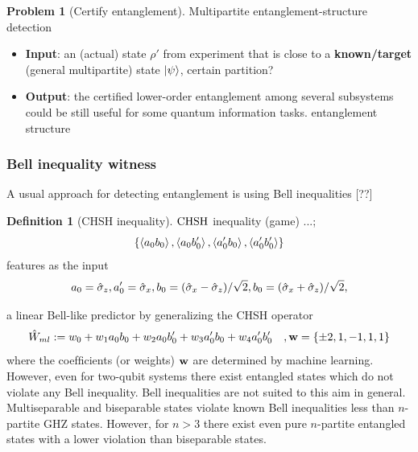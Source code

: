 \documentclass[
aps,
pra,
floatfix,
]{revtex4-2}
\theoremstyle{plain}
\theoremstyle{definition}
\newtheorem{definition}{Definition}
\newtheorem{remark}{Remark}
\newtheorem{problem}{Problem}
\newcommand{\ew}{\hat{W}}
\newcommand{\chsh}{\textup{CHSH}}
\newcommand{\dm}{\rho}
\begin{document}
\begin{problem}[Certify entanglement]
	Multipartite entanglement-structure detection
	\begin{itemize}
		\item \textbf{Input}: an (actual) state $\dm'$ from experiment that is close to a \textbf{known/target} (general multipartite) state $\ket{\psi}$,
		certain partition?
		\item \textbf{Output}: the certified lower-order entanglement among several subsystems could be still useful for some quantum information tasks.
		entanglement structure
	\end{itemize}
\end{problem}


\subsubsection{Bell inequality witness}
A usual approach for detecting entanglement is using Bell inequalities [??]
\begin{definition}[CHSH inequality]\label{def:chsh_inequality}
	$\chsh$ inequality (game) ...; 
	\begin{equation}
		\qty{\expval{a_0 b_0}, \expval{a_0 b_0'}, \expval{a_0' b_0}, \expval{a_0' b_0'} }
	\end{equation}
	features as the input 
	\begin{equation}
		a_0 = \hat{\sigma}_z, a_0' = \hat{\sigma}_x, 
		b_0 = (\hat{\sigma}_x-\hat{\sigma}_z)/\sqrt{2},
		b_0 = (\hat{\sigma}_x+\hat{\sigma}_z)/\sqrt{2},
	\end{equation}
\end{definition}
a linear Bell-like predictor by generalizing the CHSH operator
\begin{equation}
	\ew_{ml} := w_0 + w_1 a_0 b_0 +  w_2 a_0 b_0' +  w_3 a_0' b_0 +  w_4 a_0' b_0'
	\quad, \vb{w} = \qty{\pm 2, 1, -1, 1, 1}
\end{equation}
where the coefﬁcients (or weights) $\vb{w}$ are determined by machine learning.
However, even for two-qubit systems there exist entangled states which do not violate any Bell inequality.
Bell inequalities are not suited to this aim in general. Multiseparable and biseparable states violate known Bell inequalities less than $n$-partite GHZ states. However, for $n > 3$ there exist even pure $n$-partite entangled states with a lower violation than biseparable states. \cite{bourennaneWitnessingMultipartiteEntanglement2004}
\end{document}
